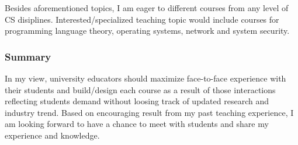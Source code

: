 \documentclass[letterpaper, 10pt]{article}
\begin{document}
\begin{small}
Besides aforementioned topics, I am eager to different courses from any level
of CS disiplines. Interested/specialized teaching topic would include courses
for programming language theory, operating systems, network and system
security.

\subsubsection*{Summary}

In my view, university educators should maximize face-to-face experience with
their students and build/design each course as a result of those interactions
reflecting students demand without loosing track of updated research and
industry trend.
%
Based on encouraging result from my past teaching experience, I am looking
forward to have a chance to meet with students and share my experience and
knowledge. 


\end{small}
\end{document}
